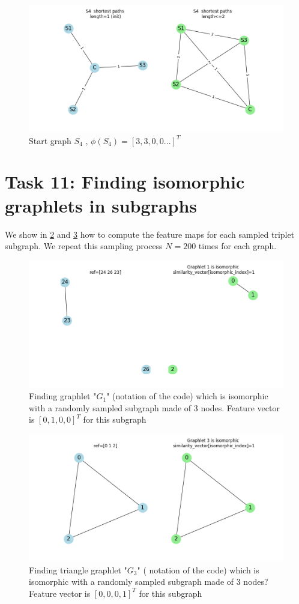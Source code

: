 \documentclass[a4paper]{article}
\begin{document}
\begin{figure}[ht]
    \centering
    \includegraphics[width=.6\textwidth]{figures/S4_shortest_paths_computation.png}
    \caption{Start graph $S_4$ , $\phi(S_4)=[3, 3, 0, 0 ...]^T$}
    \label{fig:S4_shortest_paths_computation}
\end{figure}

\pagebreak
\section*{Task 11: Finding isomorphic graphlets in subgraphs}
We show in \ref{fig:finding_isomorphic_graphlets_subgraphs} and \ref{fig:finding_isomorphic_graphlets_subgraphs_triangle}
how to compute the feature maps for each sampled triplet subgraph.
We repeat this sampling process $N=200$ times for each graph.
\begin{figure}[ht]
    \centering
    \includegraphics[width=.6\textwidth]{figures/finding_isomorphic_graphlets_subgraphs.png}
    \caption{Finding graphlet "$G_1$" (notation of the code) which is isomorphic with a randomly sampled subgraph made of 3 nodes.
    Feature vector is $[0, 1, 0, 0]^T$ for this subgraph}
    \label{fig:finding_isomorphic_graphlets_subgraphs}
\end{figure}

\begin{figure}[ht]
    \centering
    \includegraphics[width=.6\textwidth]{figures/finding_isomorphic_graphlets_subgraphs_triangle.png}
    \caption{Finding triangle graphlet "$G_3$" ( notation of the code) which is isomorphic with a randomly sampled subgraph made of 3 nodes?
    Feature vector is $[0, 0, 0, 1]^T$ for this subgraph}
    \label{fig:finding_isomorphic_graphlets_subgraphs_triangle}
\end{figure}
\pagebreak
\end{document}
